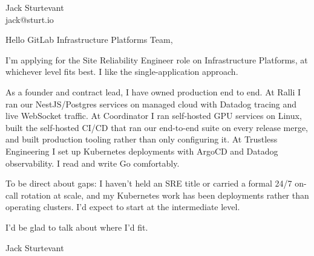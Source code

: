 \documentclass[11pt]{article}
\begin{document}
\raggedright

{\namefont\fontsize{20pt}{24pt}\selectfont Jack Sturtevant}\\[-0.3em]
jack@sturt.io

\vspace{1.2em}

Hello GitLab Infrastructure Platforms Team,

I'm applying for the Site Reliability Engineer role on Infrastructure Platforms, at whichever level fits best. I like the single-application approach.

As a founder and contract lead, I have owned production end to end. At Ralli I ran our NestJS/Postgres services on managed cloud with Datadog tracing and live WebSocket traffic. At Coordinator I ran self-hosted GPU services on Linux, built the self-hosted CI/CD that ran our end-to-end suite on every release merge, and built production tooling rather than only configuring it. At Trustless Engineering I set up Kubernetes deployments with ArgoCD and Datadog observability. I read and write Go comfortably.

To be direct about gaps: I haven't held an SRE title or carried a formal 24/7 on-call rotation at scale, and my Kubernetes work has been deployments rather than operating clusters. I'd expect to start at the intermediate level.

I'd be glad to talk about where I'd fit.

\vspace{0.6em}
Jack Sturtevant
\end{document}
